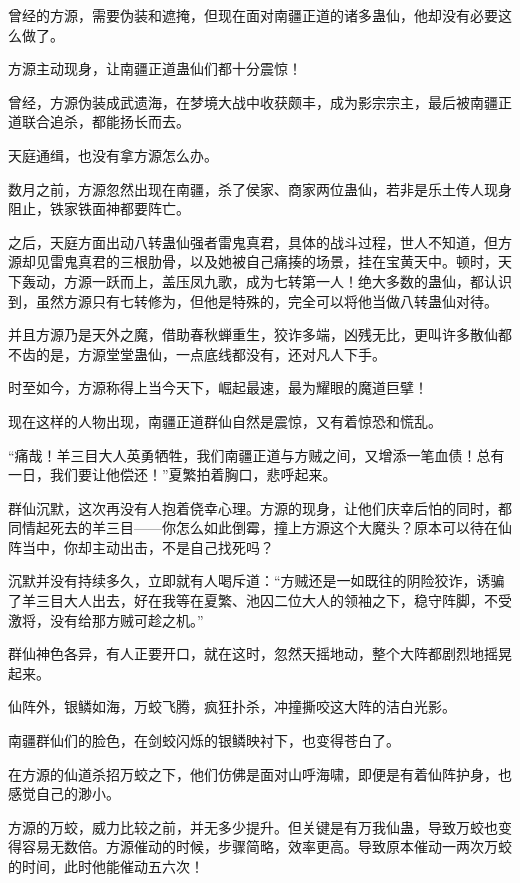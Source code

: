 
\begin{this_body}

曾经的方源，需要伪装和遮掩，但现在面对南疆正道的诸多蛊仙，他却没有必要这么做了。

方源主动现身，让南疆正道蛊仙们都十分震惊！

曾经，方源伪装成武遗海，在梦境大战中收获颇丰，成为影宗宗主，最后被南疆正道联合追杀，都能扬长而去。

天庭通缉，也没有拿方源怎么办。

数月之前，方源忽然出现在南疆，杀了侯家、商家两位蛊仙，若非是乐土传人现身阻止，铁家铁面神都要阵亡。

之后，天庭方面出动八转蛊仙强者雷鬼真君，具体的战斗过程，世人不知道，但方源却见雷鬼真君的三根肋骨，以及她被自己痛揍的场景，挂在宝黄天中。顿时，天下轰动，方源一跃而上，盖压凤九歌，成为七转第一人！绝大多数的蛊仙，都认识到，虽然方源只有七转修为，但他是特殊的，完全可以将他当做八转蛊仙对待。

并且方源乃是天外之魔，借助春秋蝉重生，狡诈多端，凶残无比，更叫许多散仙都不齿的是，方源堂堂蛊仙，一点底线都没有，还对凡人下手。

时至如今，方源称得上当今天下，崛起最速，最为耀眼的魔道巨擘！

现在这样的人物出现，南疆正道群仙自然是震惊，又有着惊恐和慌乱。

“痛哉！羊三目大人英勇牺牲，我们南疆正道与方贼之间，又增添一笔血债！总有一日，我们要让他偿还！”夏繁拍着胸口，悲呼起来。

群仙沉默，这次再没有人抱着侥幸心理。方源的现身，让他们庆幸后怕的同时，都同情起死去的羊三目——你怎么如此倒霉，撞上方源这个大魔头？原本可以待在仙阵当中，你却主动出击，不是自己找死吗？

沉默并没有持续多久，立即就有人喝斥道：“方贼还是一如既往的阴险狡诈，诱骗了羊三目大人出去，好在我等在夏繁、池囚二位大人的领袖之下，稳守阵脚，不受激将，没有给那方贼可趁之机。”

群仙神色各异，有人正要开口，就在这时，忽然天摇地动，整个大阵都剧烈地摇晃起来。

仙阵外，银鳞如海，万蛟飞腾，疯狂扑杀，冲撞撕咬这大阵的洁白光影。

南疆群仙们的脸色，在剑蛟闪烁的银鳞映衬下，也变得苍白了。

在方源的仙道杀招万蛟之下，他们仿佛是面对山呼海啸，即便是有着仙阵护身，也感觉自己的渺小。

方源的万蛟，威力比较之前，并无多少提升。但关键是有万我仙蛊，导致万蛟也变得容易无数倍。方源催动的时候，步骤简略，效率更高。导致原本催动一两次万蛟的时间，此时他能催动五六次！


\end{this_body}
